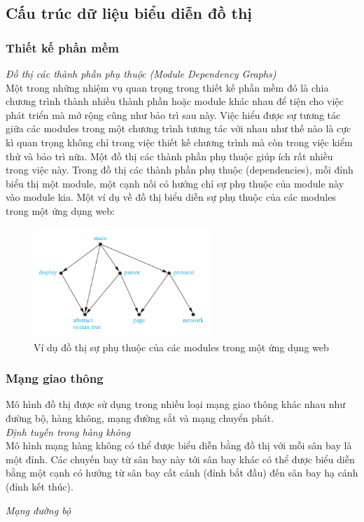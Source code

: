\subsection{Cấu trúc dữ liệu biểu diễn đồ thị}
\subsubsection{Thiết kế phần mềm}
\textit{Đồ thị các thành phần phụ thuộc (Module Dependency Graphs)} \\
Một trong những nhiệm vụ quan trọng trong thiết kế phần mềm đó là chia chương trình
thành nhiều thành phần hoặc module khác nhau để tiện cho việc phát triển mà mở rộng
cũng như bảo trì sau này. Việc hiểu được sự tương tác giữa các modules trong một 
chương trình tương tác với nhau như thế nào là cực kì quan trọng không chỉ trong việc 
thiết kế chương trình mà còn trong việc kiểm thử và bảo trì nữa. Một đồ thị các thành 
phần phụ thuộc giúp ích rất nhiều trong việc này. Trong đồ thị các thành phần phụ thuộc 
(dependencies), mỗi đỉnh biểu thị một module, một cạnh nối có hướng chỉ sự phụ thuộc 
của module này vào module kia. Một ví dụ về đồ thị biểu diễn sự phụ thuộc của các modules
trong một ứng dụng web: 
\begin{figure}[H] %
    \centering %
    \includegraphics[width=0.6\textwidth]{assets/web_grp.png} 
    \caption{Ví dụ đồ thị sự phụ thuộc của các modules
    trong một ứng dụng web} %
    \label{fig:gr_1.2.1}
\end{figure}

\subsubsection{Mạng giao thông}
Mô hình đồ thị được sử dụng trong nhiều loại mạng giao thông khác nhau như đường bộ, 
hàng không, mạng đường sắt và mạng chuyển phát. \\

\textit{Định tuyến trong hàng không} \\
Mô hình mạng hàng không có thể được biểu diễn bằng đồ thị với mỗi sân bay là một đỉnh.
Các chuyến bay từ sân bay này tới sân bay khác có thể được biểu diễn bằng một cạnh 
có hướng từ sân bay cất cánh (đỉnh bắt đầu) đến sân bay hạ cánh (đỉnh kết thúc).

\textit{Mạng đường bộ}

